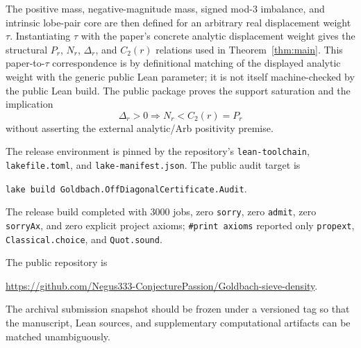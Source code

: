 \documentclass[11pt]{article}
\theoremstyle{definition}
\begin{document}
The positive mass, negative-magnitude mass, signed mod-$3$ imbalance, and intrinsic lobe-pair core are then defined for an arbitrary real displacement weight $\tau$. Instantiating $\tau$ with the paper's concrete analytic displacement weight gives the structural $P_r$, $N_r$, $\Delta_r$, and $C_2(r)$ relations used in Theorem~\ref{thm:main}. This paper-to-$\tau$ correspondence is by definitional matching of the displayed analytic weight with the generic public Lean parameter; it is not itself machine-checked by the public Lean build. The public package proves the support saturation and the implication
\[
\Delta_r>0\Longrightarrow N_r<C_2(r)=P_r
\]
without asserting the external analytic/Arb positivity premise.

The release environment is pinned by the repository's \texttt{lean-toolchain}, \texttt{lakefile.toml}, and \texttt{lake-manifest.json}. The public audit target is
\begin{center}
\texttt{lake build Goldbach.OffDiagonalCertificate.Audit}.
\end{center}
The release build completed with $3000$ jobs, zero \texttt{sorry}, zero \texttt{admit}, zero \texttt{sorryAx}, and zero explicit project axioms; \texttt{\#print axioms} reported only \texttt{propext}, \texttt{Classical.choice}, and \texttt{Quot.sound}.

The public repository is
\begin{center}
\url{https://github.com/Negus333-ConjecturePassion/Goldbach-sieve-density}.
\end{center}
The archival submission snapshot should be frozen under a versioned tag so that the manuscript, Lean sources, and supplementary computational artifacts can be matched unambiguously.
\end{document}
